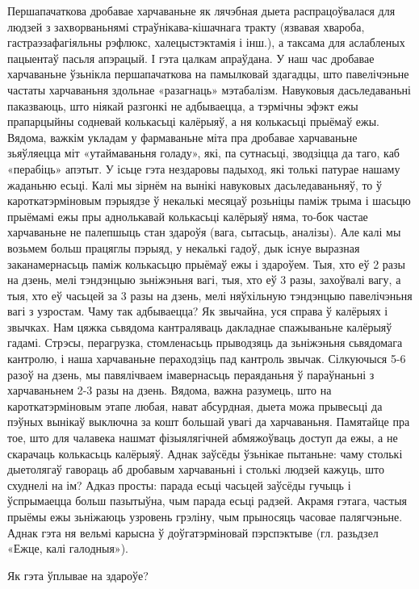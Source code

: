Першапачаткова дробавае харчаваньне як лячэбная дыета распрацоўвалася для людзей з захворваньнямі страўнікава-кішачнага тракту (язвавая хвароба, гастраэзафагіяльны рэфлюкс, халецыстэктамія і інш.), а таксама для аслабленых пацыентаў пасьля апэрацый. І гэта цалкам апраўдана.
У наш час дробавае харчаваньне ўзьнікла першапачаткова на памылковай здагадцы, што павелічэньне частаты харчаваньня здольнае «разагнаць» мэтабалізм. Навуковыя дасьледаваньні паказваюць, што ніякай разгонкі не адбываецца, а тэрмічны эфэкт ежы прапарцыйны содневай колькасьці калёрыяў, а ня колькасьці прыёмаў ежы. Вядома, важкім укладам у фармаваньне міта пра дробавае харчаваньне зьяўляецца міт «утаймаваньня голаду», які, па сутнасьці, зводзіцца да таго, каб «перабіць» апэтыт. У ісьце гэта нездаровы падыход, які толькі патурае нашаму жаданьню есьці.
Калі мы зірнём на вынікі навуковых дасьледаваньняў, то ў кароткатэрміновым пэрыядзе ў некалькі месяцаў розьніцы паміж трыма і шасьцю прыёмамі ежы пры аднолькавай колькасьці калёрыяў няма, то-бок частае харчаваньне не палепшыць стан здароўя (вага, сытасьць, аналізы). Але калі мы возьмем больш працяглы пэрыяд, у некалькі гадоў, дык існуе выразная заканамернасьць паміж колькасьцю прыёмаў ежы і здароўем. Тыя, хто еў 2 разы на дзень, мелі тэндэнцыю зьніжэньня вагі, тыя, хто еў 3 разы, захоўвалі вагу, а тыя, хто еў часьцей за 3 разы на дзень, мелі няўхільную тэндэнцыю павелічэньня вагі з узростам.
Чаму так адбываецца? Як звычайна, уся справа ў калёрыях і звычках. Нам цяжка сьвядома кантраляваць дакладнае спажываньне калёрыяў гадамі. Стрэсы, перагрузка, стомленасьць прыводзяць да зьніжэньня сьвядомага кантролю, і наша харчаваньне пераходзіць пад кантроль звычак. Сілкуючыся 5-6 разоў на дзень, мы павялічваем імавернасьць пераяданьня ў параўнаньні з харчаваньнем 2-3 разы на дзень. Вядома, важна разумець, што на кароткатэрміновым этапе любая, нават абсурдная, дыета можа прывесьці да пэўных вынікаў выключна за кошт большай увагі да харчаваньня. Памятайце пра тое, што для чалавека нашмат фізыялягічней абмяжоўваць доступ да ежы, а не скарачаць колькасьць калёрыяў.
Аднак заўсёды ўзьнікае пытаньне: чаму столькі дыетолягаў гавораць аб дробавым харчаваньні і столькі людзей кажуць, што схуднелі на ім? Адказ просты: парада есьці часьцей заўсёды гучыць і ўспрымаецца больш пазытыўна, чым парада есьці радзей. Акрамя гэтага, частыя прыёмы ежы зьніжаюць узровень грэліну, чым прыносяць часовае палягчэньне. Аднак гэта ня вельмі карысна ў доўгатэрміновай пэрспэктыве (гл. разьдзел «Ежце, калі галодныя»).

Як гэта ўплывае на здароўе?

